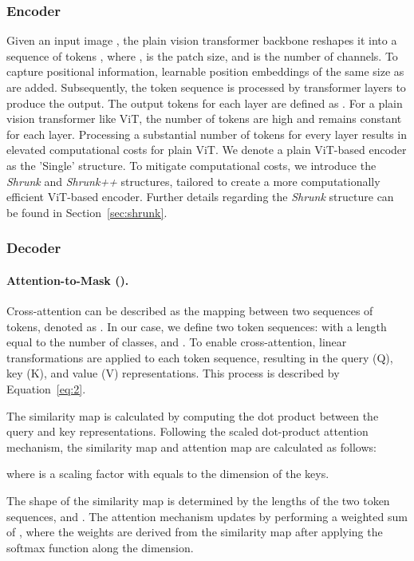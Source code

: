 \subsubsection{Encoder}
Given an input image , the plain vision transformer backbone reshapes it into a sequence of tokens , where ,  is the patch size, and  is the number of channels. 
To capture positional information, learnable position embeddings of the same size as  are added. Subsequently, the token sequence  is processed by  transformer layers to produce the output.
The output tokens for each layer are defined as .
For a plain vision transformer like ViT, the number of tokens are high and remains constant for each layer. Processing a substantial number of tokens for every layer results in elevated computational costs for plain ViT. We denote a plain ViT-based encoder as the 'Single' structure. To mitigate computational costs,  we introduce the \textit{Shrunk} and \textit{Shrunk++} structures, tailored to create a more computationally efficient ViT-based encoder. Further details regarding the \textit{Shrunk} structure can be found in Section~\ref{sec:shrunk}.

\subsubsection{Decoder}
\paragraph{Attention-to-Mask (\atm).}
Cross-attention can be described as the mapping between two sequences of tokens, denoted as . In our case, we define two token sequences:  with a length  equal to the number of classes, and .
To enable cross-attention, linear transformations are applied to each token sequence, resulting in the query (Q), key (K), and value (V) representations. This process is described by Equation~\eqref{eq:2}.


The similarity map is calculated by computing the dot product between the query and key representations. Following the scaled dot-product attention mechanism, the similarity map and attention map are calculated as follows:

where  is a scaling factor with  equals to the dimension of the keys. 

The shape of the similarity map  is determined by the lengths of the two token sequences,  and . The attention mechanism updates  by performing a weighted sum of , where the weights are derived from the similarity map after applying the softmax function along the  dimension.

